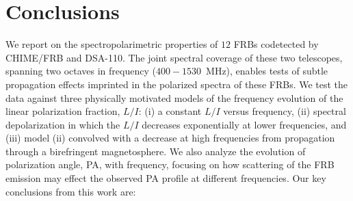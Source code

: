 \documentclass[twocolumn, linenumbers]{aastex701}
\begin{document}
\section{Conclusions} \label{sec:conclusions}
We report on the spectropolarimetric properties of $12$ FRBs codetected by CHIME/FRB and DSA-110. The joint spectral coverage of these two telescopes, spanning two octaves in frequency ($400-1530$~MHz), enables tests of subtle propagation effects imprinted in the polarized spectra of these FRBs. We test the data against three physically motivated models of the frequency evolution of the linear polarization fraction, $L/I$: (i) a constant $L/I$ versus frequency, (ii) spectral depolarization in which the $L/I$ decreases exponentially at lower frequencies, and (iii) model (ii) convolved with a decrease at high frequencies from propagation through a birefringent magnetosphere. We also analyze the evolution of polarization angle, PA, with frequency, focusing on how scattering of the FRB emission may effect the observed PA profile at different frequencies. Our key conclusions from this work are:
\end{document}

